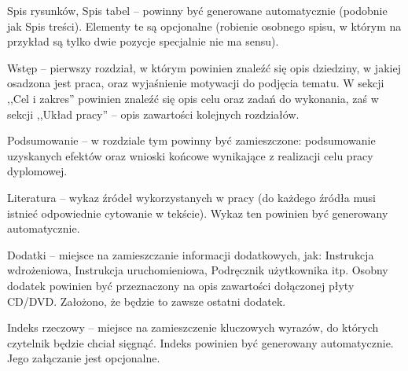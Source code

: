 Spis rysunków, Spis tabel -- powinny być generowane automatycznie (podobnie jak Spis treści). Elementy te są opcjonalne (robienie osobnego spisu, w którym na przykład są tylko dwie pozycje specjalnie nie ma sensu).

Wstęp -- pierwszy rozdział, w którym powinien znaleźć się opis dziedziny, w jakiej osadzona jest praca, oraz wyjaśnienie motywacji do podjęcia tematu.  
W sekcji ,,Cel i zakres'' powinien znaleźć się opis celu oraz zadań do wykonania, zaś w sekcji ,,Układ pracy'' -- opis zawartości kolejnych rozdziałów.

Podsumowanie -- w rozdziale tym powinny być zamieszczone: podsumowanie uzyskanych efektów oraz wnioski końcowe wynikające z realizacji celu pracy dyplomowej.

Literatura -- wykaz źródeł wykorzystanych w pracy (do każdego źródła musi istnieć odpowiednie cytowanie w tekście). Wykaz ten powinien być generowany automatycznie.

Dodatki -- miejsce na zamieszczanie informacji dodatkowych, jak: Instrukcja wdrożeniowa, Instrukcja uruchomieniowa, Podręcznik użytkownika itp.
Osobny dodatek powinien być przeznaczony na opis zawartości dołączonej płyty CD/DVD. Założono, że będzie to zawsze ostatni dodatek.

Indeks rzeczowy -- miejsce na zamieszczenie kluczowych wyrazów, do których czytelnik będzie chciał sięgnąć. Indeks powinien być generowany automatycznie. Jego załączanie jest opcjonalne.
